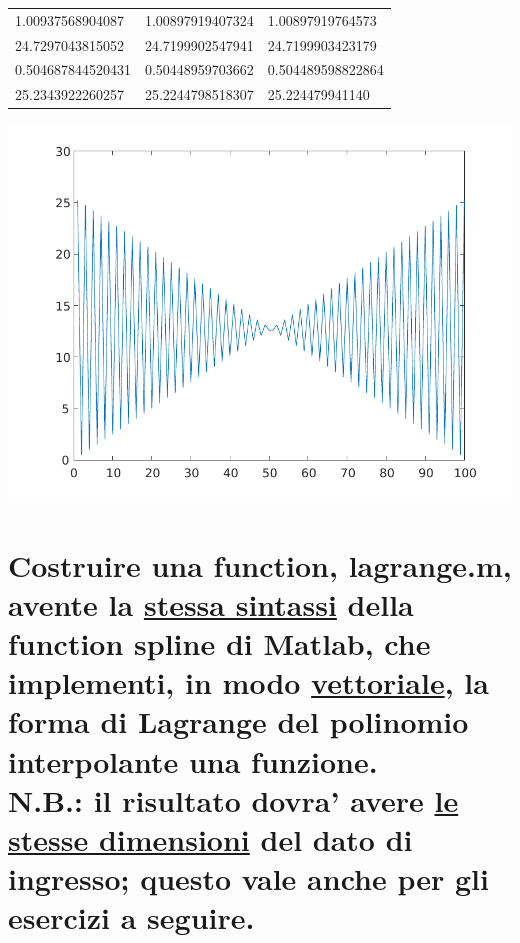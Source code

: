 \documentclass[10pt,a4paper]{article}
\begin{document}
\begin{center}
\begin{longtable}{ |p{2.8cm}|p{2.8cm}|p{2.8cm}| }
    1.00937568904087  & 1.00897919407324  & 1.00897919764573    \\
    24.7297043815052  & 24.7199902547941  & 24.7199903423179    \\
    0.504687844520431 & 0.50448959703662  & 0.504489598822864   \\
    25.2343922260257  & 25.2244798518307  & 25.224479941140     \\
    \hline
  \end{longtable}
  \includegraphics[]{./esercizi/imgs/graficonewtonj.pdf}
\end{center}

\section{
  Costruire una function, \textbf{lagrange.m}, avente la \underline{stessa sintassi} della function spline
  di Matlab, che implementi, in modo \underline{vettoriale}, la forma di Lagrange del polinomio interpolante una
  funzione.
  \\
  \textbf{N.B.:} il risultato dovra' avere \underline{le stesse dimensioni} del dato di ingresso; questo vale anche per gli
  esercizi a seguire.
 }
\end{document}
